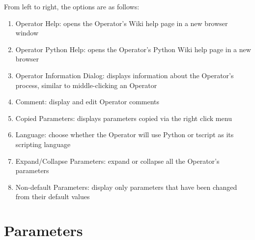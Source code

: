 \begin{fullwidth}
From left to right, the options are as follows:

\begin{enumerate}
\item Operator Help: opens the Operator's Wiki help page in a new browser window
\item Operator Python Help: opens the Operator's Python Wiki help page in a new browser
\item Operator Information Dialog: displays information about the Operator's process, similar to middle-clicking an Operator
\item Comment: display and edit Operator comments
\item Copied Parameters: displays parameters copied via the right click menu
\item Language: choose whether the Operator will use Python or tscript as its scripting language
\item Expand/Collapse Parameters: expand or collapse all the Operator's parameters
\item Non-default Parameters: display only parameters that have been changed from their default values
\end{enumerate}

\end{fullwidth}
\section{Parameters}


